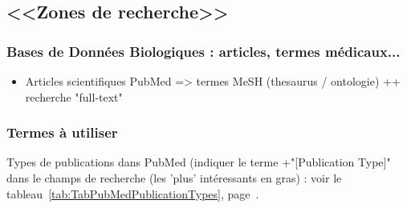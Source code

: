 \documentclass[11pt,twoside,a4paper]{article}
\begin{document}
\subsection{<<Zones de recherche>>}

\subsubsection{Bases de Donn{\'e}es Biologiques : articles, termes m{\'e}dicaux...}
	
\begin{itemize}
	\item Articles scientifiques PubMed => termes MeSH (thesaurus / ontologie) ++ recherche "full-text"
\end{itemize}

\subsubsection{Termes {\`a} utiliser}

Types de publications dans PubMed (indiquer le terme +"[Publication Type]" dans le champs de recherche (les 'plus' int{\'e}ressants en gras) : voir le tableau~\ref{tab:TabPubMedPublicationTypes}, page~\pageref{tab:TabPubMedPublicationTypes}. 
\end{document}
